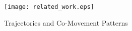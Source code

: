\begin{figure} [h]
\center
\texttt{[image: related\_work.eps]}
\caption{Trajectories and Co-Movement Patterns}
\label{fig:related_work}
\end{figure}



%



